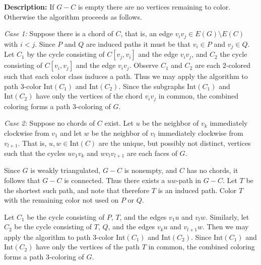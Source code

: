\documentclass[letterpaper, 12pt]{article}
\theoremstyle{definition}
\theoremstyle{definition}
\theoremstyle{thm}
\theoremstyle{definition}
\begin{document}
\noindent\textbf{Description:} If $G-C$ is empty there are no vertices remaining
to color. Otherwise the algorithm proceeds as follows.

\textit{Case 1:} Suppose there is a chord of $C$, that is, an edge
$v_iv_j\in E(G)\setminus E(C)$
with $i<j$. Since $P$ and $Q$ are induced paths it must be that $v_i\in P$ and
$v_j\in Q$. Let $C_1$ by the cycle consisting of $C[v_j,v_i]$ and the
edge $v_iv_j$, and $C_2$ the cycle consisting of $C[v_i,v_j]$ and the edge
$v_iv_j$. Observe $C_1$ and $C_2$ are each $2$-colored
such that each color class induces a path. Thus we may apply the algorithm to
path $3$-color $\text{Int}(C_1)$ and $\text{Int}(C_2)$. Since the subgraphs
$\text{Int}(C_1)$ and $\text{Int}(C_2)$ have only the vertices of the chord
$v_iv_j$ in common, the combined coloring forms a path $3$-coloring of $G$.

\textit{Case 2:} Suppose no chords of $C$ exist. Let $u$ be the neighbor of
$v_k$ immediately clockwise from $v_1$ and let $w$ be the neighbor of $v_l$
immediately clockwise from $v_{l+1}$. That is, $u,w\in\text{Int}(C)$ are the
unique, but possibly not distinct, vertices such that the cycles $uv_1v_k$ and
$wv_lv_{l+1}$ are each faces of $G$.

Since $G$ is weakly triangulated, $G-C$ is nonempty, and $C$ has no chords, it
follows that $G-C$ is connected. Thus there exists a $uw$-path in
$G-C$. Let $T$ be the shortest such path, and note that therefore $T$ is
an induced path. Color $T$ with the remaining color not used on $P$ or $Q$.

Let $C_1$ be the cycle
consisting of $P$, $T$, and the edges $v_1u$ and $v_lw$. Similarly, let $C_2$ be
the cycle consisting of $T$, $Q$, and the edges $v_ku$ and $v_{l+1}w$. Then we
may apply the algorithm to path $3$-color $\text{Int}(C_1)$ and
$\text{Int}(C_2)$. Since $\text{Int}(C_1)$ and $\text{Int}(C_2)$ have only the
vertices of the path $T$ in common, the combined coloring forms a path
$3$-coloring of $G$.\\
\end{document}
